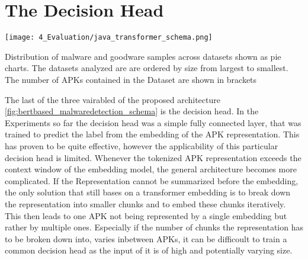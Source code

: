 \begin{table}[t] 
    \caption{\label{tab:encoder_model_comparison}%
    Performance comparison of different encoder models for generating embeddings. The APK representation is fixed to Activities (A) and Permissions (P). The encoder was trained through backpropagation in this experiment. The transcenden subset was used as dataset.}    
\end{table}

\newpage


\section{The Decision Head}

\begin{marginfigure}[3\baselineskip] %
    \center
    \texttt{[image: 4\_Evaluation/java\_transformer\_schema.png]}
    \caption{\label{fig:java_transformer_schema}
    Distribution of malware and goodware samples across datasets shown as pie charts.
    The datasets analyzed are are ordered by size from largest to smallest.
    The number of APKs contained in the Dataset are shown in brackets}
\end{marginfigure}


The last of the three vairabled of the proposed architecture \ref{fig:bertbased_malwaredetection_schema}
is the decision head. 
In the Experiments so far the decision head was a simple fully connected layer,
that was trained to predict the label from the embedding of the APK representation.
This has proven to be quite effective, however the applicability of this particular 
decision head is limited.
Whenever the tokenized APK representation exceeds the context window of the embedding 
model, the general architecture becomes more complicated.
If the Representation cannot be summarized before the embedding, the only solution 
that still bases on a transformer embedding is to break down the representation into 
smaller chunks and to embed these chunks iteratively.
This then leads to one APK not being represented by a single embedding but rather by multiple ones.
Especially if the number of chunks the representation has to be broken down into, 
varies inbetween APKs, it can be difficoult to train a common decision head as the 
input of it is of high and potentially varying size.

